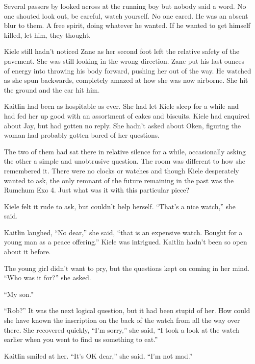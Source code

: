 Several passers by looked across at the running boy but nobody said a word.  No one shouted look out, be careful, watch yourself.  No one cared.  He was an absent blur to them.  A free spirit, doing whatever he wanted.  If he wanted to get himself killed, let him, they thought.  

Kiele still hadn't noticed Zane as her second foot left the relative safety of the pavement.  She was still looking in the wrong direction.  Zane put his last ounces of energy into throwing his body forward, pushing her out of the way.  He watched as she spun backwards, completely amazed at how she was now airborne.  She hit the ground and the car hit him.



\thoughtbreak



Kaitlin had been as hospitable as ever.  She had let Kiele sleep for a while and had fed her up good with an assortment of cakes and biscuits.  Kiele had enquired about Jay, but had gotten no reply.  She hadn't asked about Oken, figuring the woman had probably gotten bored of her questions.  

The two of them had sat there in relative silence for a while, occasionally asking the other a simple and unobtrusive question.  The room was different to how she remembered it.  There were no clocks or watches and though Kiele desperately wanted to ask, the only remnant of the future remaining in the past was the Rumchum Exo 4.  Just what was it with this particular piece?

Kiele felt it rude to ask, but couldn't help herself.  ``That's a nice watch,'' she said.  

Kaitlin laughed, ``No dear,'' she said, ``that is an expensive watch.  Bought for a young man as a peace offering.''  Kiele was intrigued.  Kaitlin hadn't been so open about it before.  

The young girl didn't want to pry, but the questions kept on coming in her mind.  ``Who was it for?'' she asked.

``My son.''

``Rob?''  It was the next logical question, but it had been stupid of her.  How could she have known the inscription on the back of the watch from all the way over there.  She recovered quickly, ``I'm sorry,'' she said, ``I took a look at the watch earlier when you went to find us something to eat.''

Kaitlin smiled at her.  ``It's OK dear,'' she said.  ``I'm not mad.''

